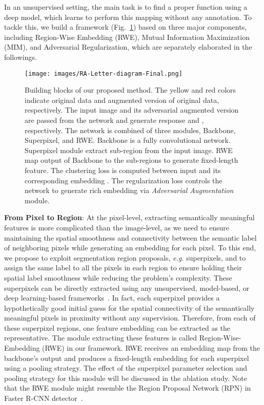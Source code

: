 \documentclass[letterpaper, 10 pt, journal, twoside]{IEEEtran}
\newcommand{\eg}{\emph{e.g.}\xspace}
\newcommand{\Fig}{Fig.\xspace}
\begin{document}
In an unsupervised setting, the main task is to find a proper function  using a deep model, which learns to perform this mapping without any annotation. To tackle this, we build a framework (\Fig~\ref{fig:usn}) based on three major components, including Region-Wise Embedding (RWE), Mutual Information Maximization (MIM), and Adversarial Regularization, which are separately elaborated in the followings.\par
\begin{figure}[t]
\begin{center}
\texttt{[image: images/RA-Letter-diagram-Final.png]}
\vspace{-2.5em}
\end{center}
   \caption{Building blocks of our proposed method. The \colorbox{myYellow}{yellow} and \colorbox{myRed}{red} colors indicate original data and augmented version of original data, respectively. The input image  and its adversarial augmented version  are passed from the network and generate response  and , respectively. The network is combined of three modules, Backbone, Superpixel, and RWE. Backbone is a fully convolutional network. Superpixel module extract sub-region from the input image. RWE map output of Backbone to the sub-regions to generate fixed-length feature. The clustering loss  is computed between input  and its corresponding embedding . The regularization loss  controls the network to generate rich embedding via \textit{Adversarial Augmentation} module.}
\label{fig:usn}
\end{figure}
\textbf{From Pixel to Region}: 
At the pixel-level, extracting semantically meaningful features is more complicated than the image-level, as we need to ensure maintaining the spatial smoothness and connectivity between the semantic label of neighboring pixels while generating an embedding for each pixel.
To this end, we propose to exploit segmentation region proposals, \eg superpixels, and to assign the same label to all the pixels in each region to ensure holding their spatial label smoothness while reducing the problem's complexity. These superpixels can be directly extracted using any unsupervised, model-based, or deep learning-based frameworks~\cite{SLIC, SSN, SP_Affinity_Loss, SP-FCN}. In fact, each superpixel provides a hypothetically good initial guess for the spatial connectivity of the semantically meaningful pixels in proximity without any supervision. Therefore, from each of these superpixel regions, one feature embedding can be extracted as the representative. The module extracting these features is called Region-Wise-Embedding (RWE) in our framework. RWE receives an embedding map from the backbone's output and produces a fixed-length embedding for each superpixel using a pooling strategy. The effect of the superpixel parameter selection and pooling strategy for this module will be discussed in the ablation study. Note that the RWE module might resemble the Region Proposal Network (RPN) in Faster R-CNN detector~\cite{FasterRCNN}.\par
\end{document}
